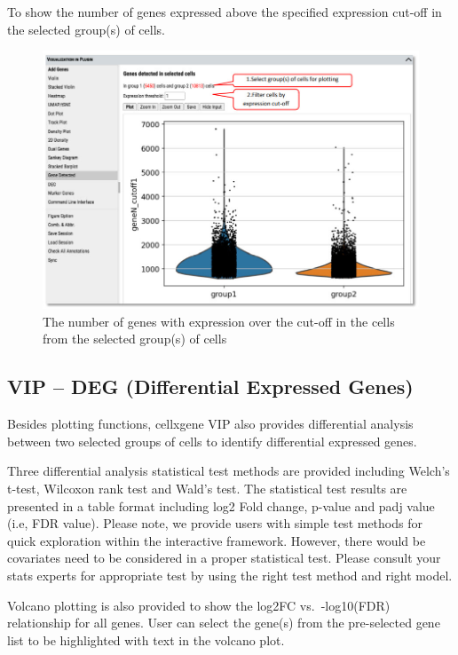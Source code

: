 \documentclass[
]{article}
\begin{document}
To show the number of genes expressed above the specified expression cut-off in the selected group(s) of cells.

\begin{figure}
\centering
\includegraphics{figures/F18.jpg}
\caption{The number of genes with expression over the cut-off in the cells from the selected group(s) of cells}
\end{figure}

\hypertarget{vip-deg-differential-expressed-genes}{%
\subsection{VIP -- DEG (Differential Expressed Genes)}\label{vip-deg-differential-expressed-genes}}

Besides plotting functions, cellxgene VIP also provides differential analysis between two selected groups of cells to identify differential expressed genes.

Three differential analysis statistical test methods are provided including Welch's t-test, Wilcoxon rank test and Wald's test. The statistical test results are presented in a table format including log2 Fold change, p-value and padj value (i.e, FDR value). Please note, we provide users with simple test methods for quick exploration within the interactive framework. However, there would be covariates need to be considered in a proper statistical test. Please consult your stats experts for appropriate test by using the right test method and right model.

Volcano plotting is also provided to show the log2FC vs.~-log10(FDR) relationship for all genes. User can select the gene(s) from the pre-selected gene list to be highlighted with text in the volcano plot.
\end{document}
